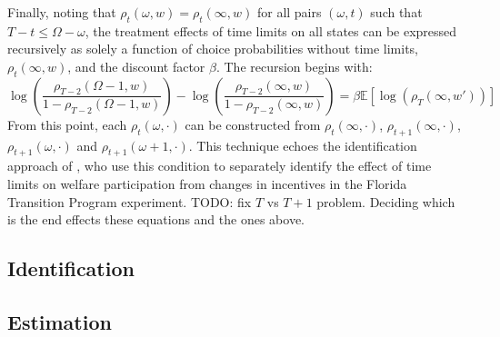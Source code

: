 \documentclass[12pt]{article}
\newcommand\EE{\mathbb{E}}
\numberwithin{equation}{section}
\numberwithin{figure}{section}
\numberwithin{table}{section}
\begin{document}
Finally, noting that $\rho_t(\omega,w) = \rho_t(\infty,w)$ for all pairs $(\omega,t)$ such that $T-t\leq\Omega-\omega$, the treatment effects of time limits on all states can be expressed recursively as solely a function of choice probabilities without time limits, $\rho_t(\infty,w)$, and the discount factor $\beta$. The recursion begins with:
\[
\log\left(\frac{\rho_{T-2}(\Omega-1,w)}{1-\rho_{T-2}(\Omega-1,w)}\right)-\log\left(\frac{\rho_{T-2}(\infty,w)}{1-\rho_{T-2}(\infty,w)}\right) = \beta\EE[\log(\rho_{T}(\infty,w'))]
\]
From this point, each $\rho_{t}(\omega,\cdot)$ can be constructed from $\rho_{t}(\infty,\cdot)$, $\rho_{t+1}(\infty,\cdot)$, $\rho_{t+1}(\omega,\cdot)$ and $\rho_{t+1}(\omega+1,\cdot)$.
This technique echoes the identification approach of \cite{GroggerMichal2003}, who use this condition to separately identify the effect of time limits on welfare participation from changes in incentives in the Florida Transition Program experiment.
{\color{red} TODO: fix $T$ vs $T+1$ problem. Deciding which is the end effects these equations and the ones above. }


\subsection{Identification}

\subsection{Estimation}


%


\end{document}
